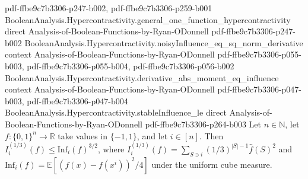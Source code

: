 \begin{theorem}
  {pdf-ffbe9c7b3306-p247-b002,
    pdf-ffbe9c7b3306-p259-b001}
\proofstep
  {BooleanAnalysis.Hypercontractivity.general_one_function_hypercontractivity}
  {direct}
  {Analysis-of-Boolean-Functions-by-Ryan-ODonnell}
  {pdf-ffbe9c7b3306-p247-b002}
\proofstep
  {BooleanAnalysis.Hypercontractivity.noisyInfluence_eq_sq_norm_derivative}
  {context}
  {Analysis-of-Boolean-Functions-by-Ryan-ODonnell}
  {pdf-ffbe9c7b3306-p055-b003,
    pdf-ffbe9c7b3306-p055-b004,
    pdf-ffbe9c7b3306-p056-b002}
\proofstep
  {BooleanAnalysis.Hypercontractivity.derivative_abs_moment_eq_influence}
  {context}
  {Analysis-of-Boolean-Functions-by-Ryan-ODonnell}
  {pdf-ffbe9c7b3306-p047-b003,
    pdf-ffbe9c7b3306-p047-b004}
\proofstep
  {BooleanAnalysis.Hypercontractivity.stableInfluence_le}
  {direct}
  {Analysis-of-Boolean-Functions-by-Ryan-ODonnell}
  {pdf-ffbe9c7b3306-p264-b003}
Let $n\in\mathbb N$, let $f:\{0,1\}^n\to\mathbb R$ take values in $\{-1,1\}$,
and let $i\in[n]$. Then $I_i^{(1/3)}(f)\le\mathrm{Inf}_i(f)^{3/2}$, where
$I_i^{(1/3)}(f)=\sum_{S\ni i}(1/3)^{|S|-1}\widehat f(S)^2$ and
$\mathrm{Inf}_i(f)=\mathbb E[(f(x)-f(x^i))^2/4]$ under the uniform cube measure.
\end{theorem}

